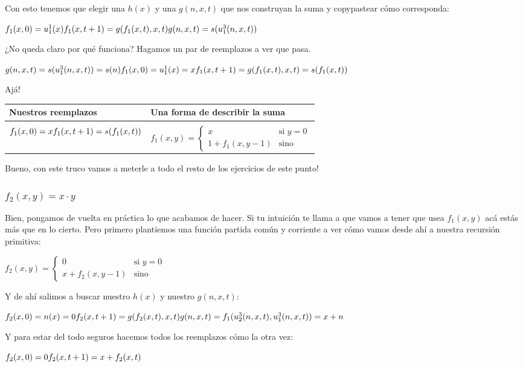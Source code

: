 \documentclass[11pt]{article} %
\newcommand{\desarrollo}[1]{

    \hspace{2em}
    \begin{minipage}{\textwidth}
        #1
    \end{minipage}

}
\begin{document}
Con esto tenemos que elegir una $h(x)$ y una $g(n,x,t)$ que nos construyan la suma y copypastear cómo corresponda:
\desarrollo{$
f_1(x,0)   = u^1_1(x) \\
f_1(x,t+1) = g(f_1(x,t),x,t) \\
g(n,x,t)   = s(u^3_1(n,x,t))
$}

¿No queda claro por qué funciona? Hagamos un par de reemplazos a ver que pasa.
\desarrollo{$
g(n,x,t)   = s(u^3_1(n,x,t)) = s(n) \\
f_1(x,0)   = u^1_1(x) = x \\
f_1(x,t+1) = g(f_1(x,t),x,t) = s(f_1(x,t))
$}

Ajá!
\desarrollo{
\begin{tabular}{m{5cm}|l}
Nuestros reemplazos & Una forma de describir la suma \\ \hline \\[-7pt]
$
f_1(x,0)   = x \newline
f_1(x,t+1) = s(f_1(x,t))
$ & $
f_1(x,y) = 
\begin{cases}
  x             & \text{si } y = 0 \\
  1 + f_1(x, y-1) & \text{sino}
\end{cases}
$
\end{tabular}
}

Bueno, con este truco vamos a meterle a todo el resto de los ejercicios de este punto!

\subsubsection{$f_2(x,y)=x \cdot y$}

Bien, pongamos de vuelta en práctica lo que acabamos de hacer. Si tu intuición te llama a que vamos a tener que usea $f_1(x,y)$ acá estás más que en lo cierto. Pero primero plantiemos una función partida común y corriente a ver cómo vamos desde ahí a nuestra recursión primitiva:
\desarrollo{$
f_2(x,y) = 
\begin{cases}
  0             & \text{si } y = 0 \\
  x + f_2(x, y-1) & \text{sino}
\end{cases}
$}

Y de ahí salimos a buscar nuestro $h(x)$ y nuestro $g(n,x,t)$:
\desarrollo{$
f_2(x,0)   = n(x) = 0 \\
f_2(x,t+1) = g(f_2(x,t),x,t) \\
g(n,x,t)   = f_1(u^3_2(n,x,t),u^3_1(n,x,t)) = x + n
$}

Y para estar del todo seguros hacemos todos los reemplazos cómo la otra vez:
\desarrollo{$
f_2(x,0)   = 0\\
f_2(x,t+1) = x + f_2(x,t)
$}
\end{document}
